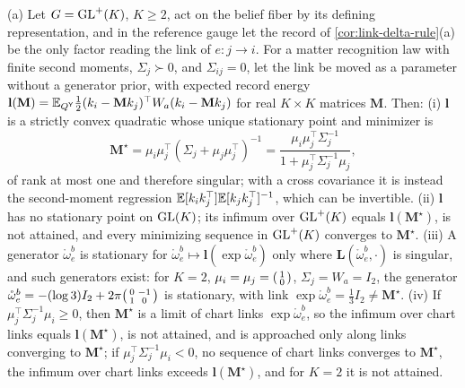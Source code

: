 (a) Let $G=\mathrm{GL}^+(K)$, $K\geq2$, act on the belief fiber by its defining representation, and in the reference
gauge let the record of \cref{cor:link-delta-rule}(a) be the only factor reading the link of $e:j\to i$.
For a matter recognition law with finite second moments, $\Sigma_j\succ0$, and $\Sigma_{ij}=0$, let the link be
moved as a parameter without a generator prior, with expected record energy
$\mathbf l(\mathbf M)=\mathbb E_{Q^{\mathsf Y}}\frac12(k_i-\mathbf Mk_j)^\top W_a(k_i-\mathbf Mk_j)$ for real
$K\times K$ matrices $\mathbf M$. Then:
(i) $\mathbf l$ is a strictly convex quadratic whose unique stationary point and minimizer is
\begin{equation}
\mathbf M^\star=\mu_i\mu_j^\top(\Sigma_j+\mu_j\mu_j^\top)^{-1}
=\frac{\mu_i\mu_j^\top\Sigma_j^{-1}}{1+\mu_j^\top\Sigma_j^{-1}\mu_j},
\label{eq:link-rank-one}
\end{equation}
of rank at most one and therefore singular; with a cross covariance it is instead the second-moment
regression $\mathbb E[k_ik_j^\top]\mathbb E[k_jk_j^\top]^{-1}$, which can be invertible. (ii) $\mathbf l$ has no stationary
point on $\mathrm{GL}(K)$; its infimum over $\mathrm{GL}^+(K)$ equals $\mathbf l(\mathbf M^\star)$, is not attained, and every
minimizing sequence in $\mathrm{GL}^+(K)$ converges to $\mathbf M^\star$. (iii) A generator $\mathring\omega^b_e$ is
stationary for $\mathring\omega^b_e\mapsto\mathbf l(\exp\mathring\omega^b_e)$ only where
$\mathbf L(\mathring\omega^b_e,\cdot)$ is singular, and such generators exist: for $K=2$,
$\mu_i=\mu_j=\begin{psmallmatrix}1\\0\end{psmallmatrix}$, $\Sigma_j=W_a=I_2$, the generator
$\mathring\omega^b_e=-(\log3)I_2+2\pi\begin{psmallmatrix}0&-1\\1&0\end{psmallmatrix}$ is stationary, with link
$\exp\mathring\omega^b_e=\frac13I_2\neq\mathbf M^\star$. (iv) If $\mu_j^\top\Sigma_j^{-1}\mu_i\geq0$, then
$\mathbf M^\star$ is a limit of chart links $\exp\mathring\omega^b_e$, so the infimum over chart links equals
$\mathbf l(\mathbf M^\star)$, is not attained, and is approached only along links converging to
$\mathbf M^\star$; if $\mu_j^\top\Sigma_j^{-1}\mu_i<0$, no sequence of chart links converges to $\mathbf M^\star$, the
infimum over chart links exceeds $\mathbf l(\mathbf M^\star)$, and for $K=2$ it is not attained.

